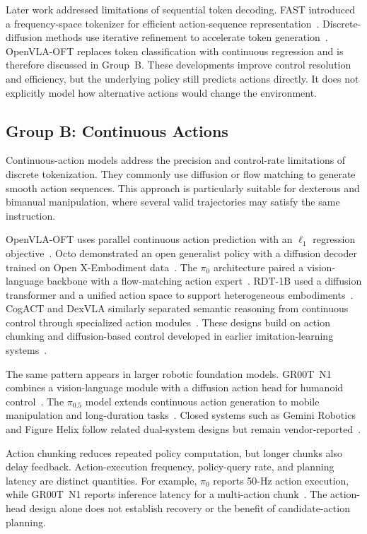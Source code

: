 \documentclass{ieeeaccess}
\begin{document}
Later work addressed limitations of sequential token decoding. FAST introduced a frequency-space tokenizer for efficient action-sequence representation~\cite{fast}. \textcolor[RGB]{104,48,148}{Discrete-diffusion methods use iterative refinement to accelerate token generation~\cite{ddvla}. OpenVLA-OFT replaces token classification with continuous regression and is therefore discussed in Group~B.} These developments improve control resolution and efficiency, but the underlying policy still predicts actions directly. It does not explicitly model how alternative actions would change the environment.

\subsection{Group B: Continuous Actions}
\label{sec:groupB}

Continuous-action models address the precision and control-rate limitations of discrete tokenization. They commonly use diffusion or flow matching to generate smooth action sequences. This approach is particularly suitable for dexterous and bimanual manipulation, where several valid trajectories may satisfy the same instruction.

\textcolor[RGB]{104,48,148}{OpenVLA-OFT uses parallel continuous action prediction with an $\ell_1$ regression objective~\cite{openvlaoft}.} Octo demonstrated an open generalist policy with a diffusion decoder trained on Open X-Embodiment data~\cite{octo}. The $\pi_0$ architecture paired a vision-language backbone with a flow-matching action expert~\cite{pi0}. RDT-1B used a diffusion transformer and a unified action space to support heterogeneous embodiments~\cite{rdt1b}. CogACT and DexVLA similarly separated semantic reasoning from continuous control through specialized action modules~\cite{cogact,dexvla}. These designs build on action chunking and diffusion-based control developed in earlier imitation-learning systems~\cite{act,mobilealoha,diffusionpolicy}.

The same pattern appears in larger robotic foundation models. GR00T~N1 combines a vision-language module with a diffusion action head for humanoid control~\cite{groot}. The $\pi_{0.5}$ model extends continuous action generation to mobile manipulation and long-duration tasks~\cite{pi05}. Closed systems such as Gemini Robotics and Figure Helix follow related dual-system designs but remain vendor-reported~\cite{geminirobotics,helix}.

Action chunking reduces repeated policy computation, but longer chunks also delay feedback. \textcolor[RGB]{104,48,148}{Action-execution frequency, policy-query rate, and planning latency are distinct quantities. For example, $\pi_0$ reports 50-Hz action execution, while GR00T~N1 reports inference latency for a multi-action chunk~\cite{pi0,groot}. The action-head design alone does not establish recovery or the benefit of candidate-action planning.}
\end{document}

